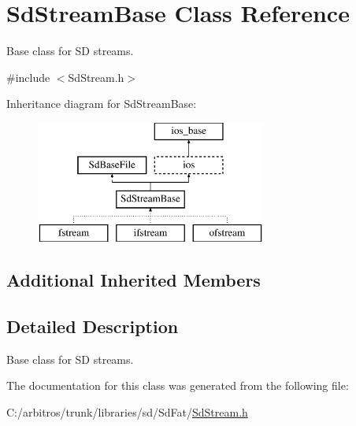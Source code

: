 \hypertarget{class_sd_stream_base}{\section{Sd\-Stream\-Base Class Reference}
\label{class_sd_stream_base}
}


Base class for S\-D streams.  




{\ttfamily \#include $<$Sd\-Stream.\-h$>$}

Inheritance diagram for Sd\-Stream\-Base\-:\begin{figure}[H]
\begin{center}
\leavevmode
\includegraphics[height=4.000000cm]{class_sd_stream_base}
\end{center}
\end{figure}
\subsection*{Additional Inherited Members}


\subsection{Detailed Description}
Base class for S\-D streams. 

The documentation for this class was generated from the following file\-:\begin{DoxyCompactItemize}
\item 
C\-:/arbitros/trunk/libraries/sd/\-Sd\-Fat/\hyperlink{_sd_stream_8h}{Sd\-Stream.\-h}\end{DoxyCompactItemize}
